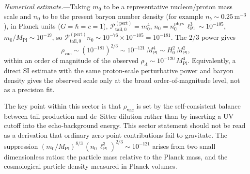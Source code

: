 \documentclass[aps,prd,onecolumn,superscriptaddress,nofootinbib,showpacs,12pt,notitlepage]{revtex4-2}
\newcommand{\Mpl}{M_{\mathrm{Pl}}}
\begin{document}
\textit{Numerical estimate.}---Taking $m_0$ to be a representative
nucleon/proton mass scale and $n_0$ to be the present baryon number
density (for example $n_b\sim 0.25\,\mathrm{m}^{-3}$), in Planck units
($G = \hbar = c = 1$),
$\mathcal{P}_{\mathrm{tail},0}^{\mathrm{(pert)}} = m_0^{4}$,
$n_0 = n_0^{\mathrm{phys}}\,\ell_{\mathrm{Pl}}^{3}
\sim 10^{-105}$,
$m_0/\Mpl \sim 10^{-19}$, so
$\mathcal{P}_{\mathrm{tail},0}^{\mathrm{(pert)}} n_0
\sim 10^{-76}\times 10^{-105} = 10^{-181}$.
The $2/3$ power gives
\begin{equation}
  \rho_{\mathrm{vac}} \sim (10^{-181})^{2/3}
  \sim 10^{-121}\,\Mpl^{4}
  \sim H_0^{2}\,\Mpl^{2},
\end{equation}
within an order of magnitude of the observed
$\rho_{\Lambda} \sim 10^{-120}\,\Mpl^{4}$.
Equivalently, a direct SI estimate with the same proton-scale
perturbative power and baryon density gives the observed scale only
at the broad order-of-magnitude level, not as a precision fit.

The key point within this sector is that $\rho_{\mathrm{vac}}$ is set
by the self-consistent balance between tail production and de~Sitter
dilution rather than by inserting a UV cutoff into the
echo-background energy.  This sector statement should not be read as
a derivation that ordinary zero-point contributions fail to gravitate.
The suppression
$(m_0/\Mpl)^{8/3}\,(n_0\,\ell_{\mathrm{Pl}}^{3})^{2/3}
\sim 10^{-121}$ arises from two small dimensionless
ratios: the particle mass relative to the Planck mass,
and the cosmological particle density measured in
Planck volumes.
\end{document}
